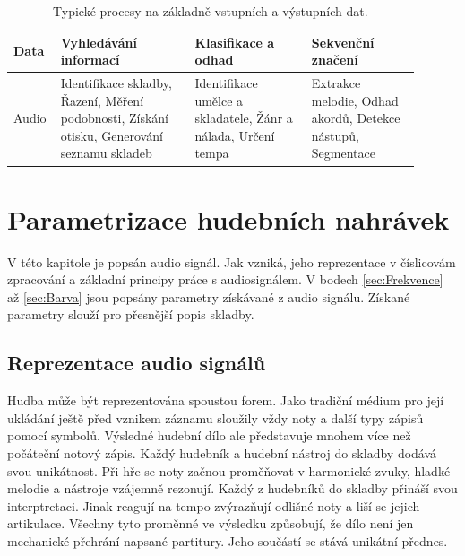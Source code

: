   \begin{table}[H]
    \centering
    \begin{tabular}{|p{0.07\linewidth} | p{0.31\linewidth} | p{0.27\linewidth} | p{0.25\linewidth}|}
        \hline
        {\bf Data}                 & {\bf Vyhledávání informací} & {\bf Klasifikace a odhad} & {\bf Sekvenční značení}\\
        \hline
        Audio                      & Identifikace skladby,
                                     Řazení,
                                     Měření podobnosti,
                                     Získání otisku,
                                     Generování seznamu skladeb
                                   & Identifikace umělce a skladatele,
                                     Žánr a nálada,
                                     Určení tempa
                                   & Extrakce melodie,
                                     Odhad akordů,
                                     Detekce nástupů,
                                     Segmentace                   \\
        \hline
    \end{tabular}
    \caption{Typické procesy na základně vstupních a výstupních dat.}
    \label{tab:MIR_typicke_procesy}
  \end{table}



  \section{Parametrizace hudebních nahrávek}
  V této kapitole je popsán audio signál. Jak vzniká, jeho reprezentace v číslicovám zpracování a základní principy práce s audiosignálem.
  V bodech \ref{sec:Frekvence} až \ref{sec:Barva} jsou popsány parametry získávané z audio signálu. %
  Získané parametry slouží pro přesnější popis skladby. \cite{fundamental_of_music_processing}

  \subsection{Reprezentace audio signálů}
  Hudba může být reprezentována spoustou forem. 
  Jako tradiční médium pro její ukládání ještě před vznikem záznamu sloužily vždy noty a další typy zápisů pomocí symbolů.
  Výsledné hudební dílo ale představuje mnohem více než počáteční notový zápis.
  Každý hudebník a hudební nástroj do skladby dodává svou unikátnost.
  Při hře se noty začnou proměňovat v harmonické zvuky, hladké melodie a nástroje vzájemně rezonují. 
  Každý z hudebníků do skladby přináší svou interptretaci. Jinak reagují na tempo zvýrazňují odlišné noty a liší se jejich artikulace.
  Všechny tyto proměnné ve výsledku způsobují, že dílo není jen mechanické přehrání napsané partitury.
  Jeho součástí se stává unikátní přednes.

